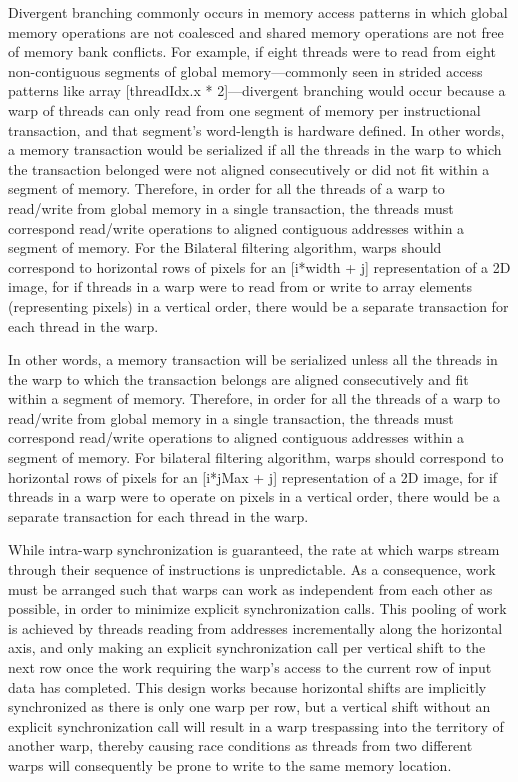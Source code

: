 \documentclass{IEEEtran}
\begin{document}
Divergent branching commonly occurs in memory access patterns in which global memory operations are not coalesced and shared memory operations are not free of memory bank conflicts. For example, if eight threads were to read from eight non-contiguous segments of global memory---commonly seen in strided access patterns like array {[}threadIdx.x {*} 2{]}---divergent branching would occur because a warp of threads can only read from one segment of memory per instructional transaction, and that segment's word-length is hardware defined. In other words, a memory transaction would be serialized if all the threads in the warp to which the transaction belonged were not aligned consecutively or did not fit within a segment of memory. Therefore, in order for all the threads of a warp to read/write from global memory in a single transaction, the threads must correspond read/write operations to aligned contiguous addresses within a segment of memory. For the Bilateral filtering algorithm, warps should correspond to horizontal rows of pixels for an [i*width + j] representation of a 2D image, for if threads in a warp were to read from or write to array elements (representing pixels) in a vertical order, there would be a separate transaction for each thread in the warp.

In other words, a memory transaction will be serialized unless all the threads in the warp to which the transaction belongs are aligned consecutively and fit within a segment of memory. Therefore, in order for all the threads of a warp to read/write from global memory in a single transaction, the threads must correspond read/write operations to aligned contiguous addresses within a segment of memory. For bilateral filtering algorithm, warps should correspond to horizontal rows of pixels for an [i*jMax + j] representation of a 2D image, for if threads in a warp were to operate on pixels in a vertical order, there would be a separate transaction for each thread in the warp.

While intra-warp synchronization is guaranteed, the rate at which warps stream through their sequence of instructions is unpredictable. As a consequence, work must be arranged such that warps can work as independent from each other as possible, in order to minimize explicit synchronization calls. This pooling of work is achieved by threads reading from addresses incrementally along the horizontal axis, and only making an explicit synchronization call per vertical shift to the next row once the work requiring the warp's access to the current row of input data has completed. This design works because horizontal shifts are implicitly synchronized as there is only one warp per row, but a vertical shift without an explicit synchronization call will result in a warp trespassing into the territory of another warp, thereby causing race conditions as threads from two different warps will consequently be prone to write to the same memory location. 
\end{document}
